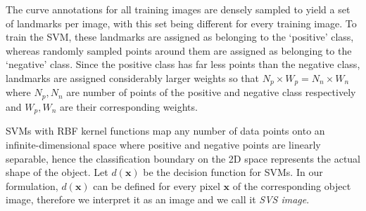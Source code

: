 The curve annotations for all training images are densely sampled to yield a set of landmarks per image, with this set being different for every training image. To train the SVM, these landmarks are assigned as belonging to the `positive' class, whereas randomly sampled points around them are assigned as belonging to the `negative' class. Since the positive class has far less points than the negative class, landmarks are assigned considerably larger weights so that $N_p \times W_p=N_n \times W_n$ where $N_p, N_n$ are number of points of the positive and negative class respectively and $W_p, W_n$ are their corresponding weights.

SVMs with RBF kernel functions map any number of data points onto an infinite-dimensional space where positive and negative points are linearly separable, hence the classification boundary on the 2D space represents the actual shape of the object.
Let $d(\bm{x})$ be the decision function for SVMs. In our formulation, $d(\bm{x})$ can be defined for every pixel $\bm{x}$ of the corresponding object image, therefore we interpret it as an image and we call it \emph{SVS image}.






